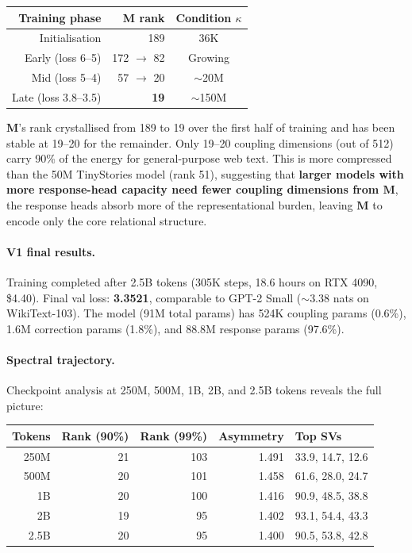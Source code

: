 \documentclass[11pt, a4paper]{article}
\newcommand{\M}{\mathbf{M}}
\theoremstyle{remark}
\begin{document}
\begin{center}\small
\begin{tabular}{@{}rrc@{}}
\toprule
\textbf{Training phase} & \textbf{M rank} & \textbf{Condition $\kappa$} \\
\midrule
Initialisation & 189 & 36K \\
Early (loss 6--5) & 172 $\to$ 82 & Growing \\
Mid (loss 5--4) & 57 $\to$ 20 & $\sim$20M \\
Late (loss 3.8--3.5) & \textbf{19} & $\sim$150M \\
\bottomrule
\end{tabular}
\end{center}

$\M$'s rank crystallised from 189 to 19 over the first half of training and has been stable at 19--20 for the remainder.
Only 19--20 coupling dimensions (out of 512) carry 90\% of the energy for general-purpose web text.
This is more compressed than the 50M TinyStories model (rank 51), suggesting that \textbf{larger models with more response-head capacity need fewer coupling dimensions from $\M$}, the response heads absorb more of the representational burden, leaving $\M$ to encode only the core relational structure.

\paragraph{V1 final results.}
Training completed after 2.5B tokens (305K steps, 18.6 hours on RTX 4090, \$4.40).
Final val loss: \textbf{3.3521}, comparable to GPT-2 Small ($\sim$3.38 nats on WikiText-103).
The model (91M total params) has 524K coupling params (0.6\%), 1.6M correction params (1.8\%), and 88.8M response params (97.6\%).

\paragraph{Spectral trajectory.}
Checkpoint analysis at 250M, 500M, 1B, 2B, and 2.5B tokens reveals the full picture:

\begin{center}\small
\begin{tabular}{@{}rrrrl@{}}
\toprule
\textbf{Tokens} & \textbf{Rank (90\%)} & \textbf{Rank (99\%)} & \textbf{Asymmetry} & \textbf{Top SVs} \\
\midrule
250M  & 21 & 103 & 1.491 & 33.9, 14.7, 12.6 \\
500M  & 20 & 101 & 1.458 & 61.6, 28.0, 24.7 \\
1B    & 20 & 100 & 1.416 & 90.9, 48.5, 38.8 \\
2B    & 19 &  95 & 1.402 & 93.1, 54.4, 43.3 \\
2.5B  & 20 &  95 & 1.400 & 90.5, 53.8, 42.8 \\
\bottomrule
\end{tabular}
\end{center}
\end{document}
